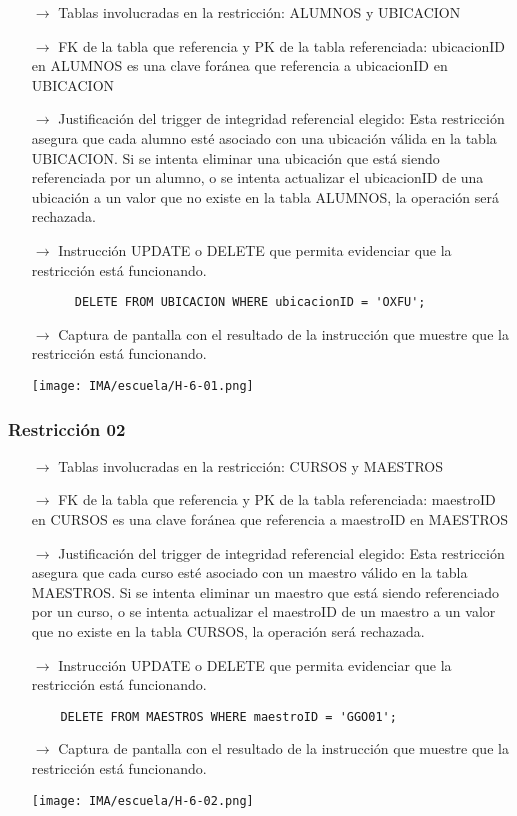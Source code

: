 \begin{itemize}
    \item[$\rightarrow$] Tablas involucradas en la restricción: ALUMNOS y UBICACION
    \item[$\rightarrow$] FK de la tabla que referencia y PK de la tabla referenciada: ubicacionID en ALUMNOS es una clave foránea que referencia a ubicacionID en UBICACION
    \item[$\rightarrow$] Justificación del trigger de integridad referencial elegido: Esta restricción asegura que cada alumno esté asociado con una ubicación válida en la tabla UBICACION. Si se intenta eliminar una ubicación que está siendo referenciada por un alumno, o se intenta actualizar el ubicacionID de una ubicación a un valor que no existe en la tabla ALUMNOS, la operación será rechazada.
    \item[$\rightarrow$] Instrucción UPDATE o DELETE que permita evidenciar que la restricción está funcionando.
    \begin{verbatim}
      DELETE FROM UBICACION WHERE ubicacionID = 'OXFU';
    \end{verbatim}
    \item[$\rightarrow$] Captura de pantalla con el resultado de la instrucción que muestre que la restricción está
    funcionando.
    \begin{center}
        \texttt{[image: IMA/escuela/H-6-01.png]}
    \end{center}
\end{itemize}


\subsubsection*{Restricción 02}

\begin{itemize}
  \item[$\rightarrow$] Tablas involucradas en la restricción: CURSOS y MAESTROS
  \item[$\rightarrow$] FK de la tabla que referencia y PK de la tabla referenciada: maestroID en CURSOS es una clave foránea que referencia a maestroID en MAESTROS
  \item[$\rightarrow$] Justificación del trigger de integridad referencial elegido: Esta restricción asegura que cada curso esté asociado con un maestro válido en la tabla MAESTROS. Si se intenta eliminar un maestro que está siendo referenciado por un curso, o se intenta actualizar el maestroID de un maestro a un valor que no existe en la tabla CURSOS, la operación será rechazada.
  \item[$\rightarrow$] Instrucción UPDATE o DELETE que permita evidenciar que la restricción está funcionando.
  \begin{verbatim}
    DELETE FROM MAESTROS WHERE maestroID = 'GGO01';
  \end{verbatim}
  \item[$\rightarrow$] Captura de pantalla con el resultado de la instrucción que muestre que la restricción está funcionando.
  \begin{center}
    \texttt{[image: IMA/escuela/H-6-02.png]}
  \end{center}
\end{itemize}

